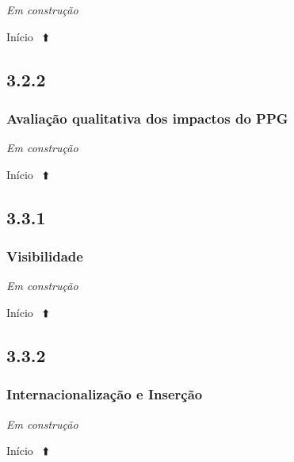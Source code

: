 \documentclass[
  a4paper,
]{book}
\begin{document}
\emph{Em construção}

Início ~⬆️

\hypertarget{section-26}{%
\subsection{\texorpdfstring{\textbf{3.2.2}}{3.2.2}}\label{section-26}}

\hypertarget{avaliauxe7uxe3o-qualitativa-dos-impactos-do-ppg}{%
\subsubsection{\texorpdfstring{\textbf{Avaliação qualitativa dos impactos do PPG}}{Avaliação qualitativa dos impactos do PPG}}\label{avaliauxe7uxe3o-qualitativa-dos-impactos-do-ppg}}

\emph{Em construção}

Início ~⬆️

\hypertarget{section-27}{%
\subsection{\texorpdfstring{\textbf{3.3.1}}{3.3.1}}\label{section-27}}

\hypertarget{visibilidade}{%
\subsubsection{\texorpdfstring{\textbf{Visibilidade}}{Visibilidade}}\label{visibilidade}}

\emph{Em construção}

Início ~⬆️

\hypertarget{section-28}{%
\subsection{\texorpdfstring{\textbf{3.3.2}}{3.3.2}}\label{section-28}}

\hypertarget{internacionalizauxe7uxe3o-e-inseruxe7uxe3o}{%
\subsubsection{\texorpdfstring{\textbf{Internacionalização e Inserção}}{Internacionalização e Inserção}}\label{internacionalizauxe7uxe3o-e-inseruxe7uxe3o}}

\emph{Em construção}

Início ~⬆️
\end{document}
